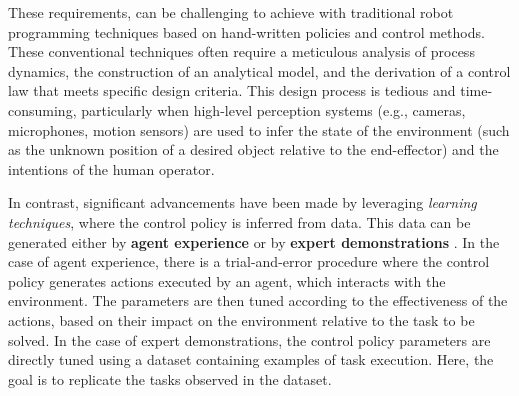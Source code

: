 These requirements, can be challenging to achieve with traditional robot programming techniques based on hand-written policies and control methods. These conventional techniques often require a meticulous analysis of process dynamics, the construction of an analytical model, and the derivation of a control law that meets specific design criteria. This design process is tedious and time-consuming, particularly when high-level perception systems (e.g., cameras, microphones, motion sensors) are used to infer the state of the environment (such as the unknown position of a desired object relative to the end-effector) and the intentions of the human operator.

In contrast, significant advancements have been made by leveraging \textit{learning techniques}, where the control policy is inferred from data. This data can be generated either by \textbf{agent experience} \cite{sutton2018reinforcement} or by \textbf{expert demonstrations} \cite{osa2018algorithmic}. 
\newline In the case of agent experience, there is a trial-and-error procedure where the control policy generates actions executed by an agent, which interacts with the environment. The parameters are then tuned according to the effectiveness of the actions, based on their impact on the environment relative to the task to be solved. 
\newline In the case of expert demonstrations, the control policy parameters are directly tuned using a dataset containing examples of task execution. Here, the goal is to replicate the tasks observed in the dataset.

